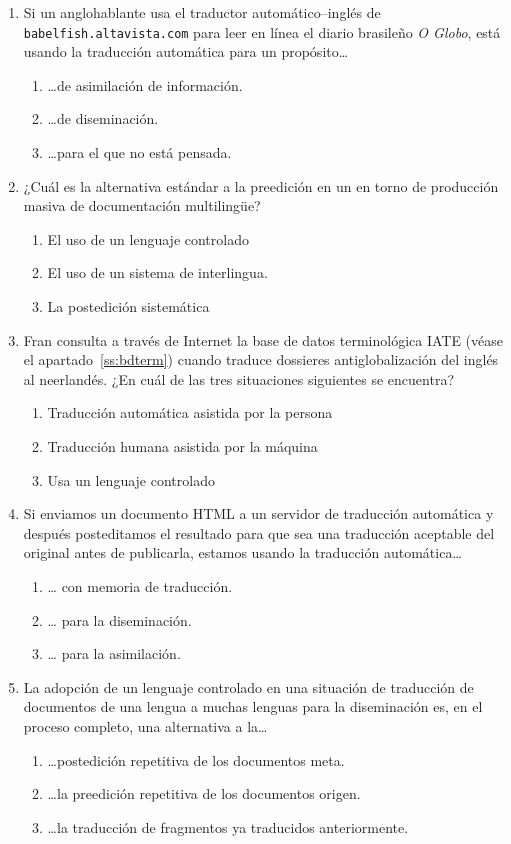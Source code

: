 \begin{enumerate}
\item Si un anglohablante usa el traductor automático--inglés de \verb|babelfish.altavista.com| para leer en línea el diario brasileño \emph{O Globo}, está usando la traducción automática para un propósito\ldots \begin{enumerate} \item \ldots de asimilación de información. \item \ldots de diseminación. \item \ldots para el que no está pensada. \end{enumerate} 

\item ¿Cuál es la alternativa estándar a la preedición en un en torno de producción masiva de documentación multilingüe? \begin{enumerate} \item El uso de un lenguaje controlado \item El uso de un sistema de interlingua. \item La postedición sistemática \end{enumerate} 

\item Fran consulta a través de Internet la base de datos terminológica IATE (véase el apartado~\ref{ss:bdterm}) cuando traduce dossieres antiglobalización del inglés al neerlandés. ¿En cuál de las tres situaciones siguientes se encuentra? \begin{enumerate} \item Traducción automática asistida por la persona \item Traducción humana asistida por la máquina \item Usa un lenguaje controlado \end{enumerate} 

\item Si enviamos un documento HTML a un servidor de traducción automática y después posteditamos el resultado para que sea una traducción aceptable del original antes de publicarla, estamos usando la traducción automática{\ldots} \begin{enumerate} \item {\ldots} con memoria de traducción. \item {\ldots} para la diseminación. \item {\ldots} para la asimilación. \end{enumerate} 

\item La adopción de un lenguaje controlado en una situación de traducción de documentos de una lengua a muchas lenguas para la diseminación es, en el proceso completo, una alternativa a la{\ldots} \begin{enumerate} \item {\ldots}postedición repetitiva de los documentos meta. \item {\ldots}la preedición repetitiva de los documentos origen. \item {\ldots}la traducción de fragmentos ya traducidos anteriormente. \end{enumerate} 


\end{enumerate}
